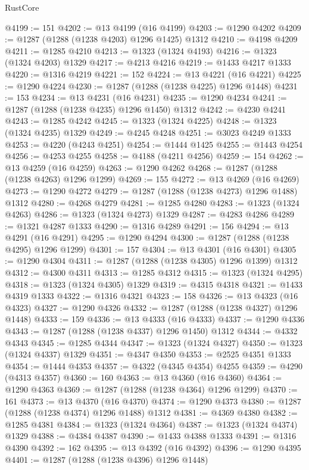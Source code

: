 \begin{lexlean}{RustCore}
\begin{coremodule}
@4199 := 151
@4202 := @13 @4199 (@16 @4199)
@4203 := @1290 @4202
@4209 := @1287 (@1288 (@1238 @4203) @1296 @1425) @1312
@4210 := @4198 @4209
@4211 := @1285 @4210
@4213 := @1323 (@1324 @4193)
@4216 := @1323 (@1324 @4203) @1329
@4217 := @4213 @4216
@4219 := @1433 @4217 @1333
@4220 := @1316 @4219
@4221 := 152
@4224 := @13 @4221 (@16 @4221)
@4225 := @1290 @4224
@4230 := @1287 (@1288 (@1238 @4225) @1296 @1448)
@4231 := 153
@4234 := @13 @4231 (@16 @4231)
@4235 := @1290 @4234
@4241 := @1287 (@1288 (@1238 @4235) @1296 @1450) @1312
@4242 := @4230 @4241
@4243 := @1285 @4242
@4245 := @1323 (@1324 @4225)
@4248 := @1323 (@1324 @4235) @1329
@4249 := @4245 @4248
@4251 := @3023 @4249 @1333
@4253 := @4220 (@4243 @4251)
@4254 := @1444 @1425
@4255 := @1443 @4254
@4256 := @4253 @4255
@4258 := @4188 (@4211 @4256)
@4259 := 154
@4262 := @13 @4259 (@16 @4259)
@4263 := @1290 @4262
@4268 := @1287 (@1288 (@1238 @4263) @1296 @1299)
@4269 := 155
@4272 := @13 @4269 (@16 @4269)
@4273 := @1290 @4272
@4279 := @1287 (@1288 (@1238 @4273) @1296 @1488) @1312
@4280 := @4268 @4279
@4281 := @1285 @4280
@4283 := @1323 (@1324 @4263)
@4286 := @1323 (@1324 @4273) @1329
@4287 := @4283 @4286
@4289 := @1321 @4287 @1333
@4290 := @1316 @4289
@4291 := 156
@4294 := @13 @4291 (@16 @4291)
@4295 := @1290 @4294
@4300 := @1287 (@1288 (@1238 @4295) @1296 @1299)
@4301 := 157
@4304 := @13 @4301 (@16 @4301)
@4305 := @1290 @4304
@4311 := @1287 (@1288 (@1238 @4305) @1296 @1399) @1312
@4312 := @4300 @4311
@4313 := @1285 @4312
@4315 := @1323 (@1324 @4295)
@4318 := @1323 (@1324 @4305) @1329
@4319 := @4315 @4318
@4321 := @1433 @4319 @1333
@4322 := @1316 @4321
@4323 := 158
@4326 := @13 @4323 (@16 @4323)
@4327 := @1290 @4326
@4332 := @1287 (@1288 (@1238 @4327) @1296 @1448)
@4333 := 159
@4336 := @13 @4333 (@16 @4333)
@4337 := @1290 @4336
@4343 := @1287 (@1288 (@1238 @4337) @1296 @1450) @1312
@4344 := @4332 @4343
@4345 := @1285 @4344
@4347 := @1323 (@1324 @4327)
@4350 := @1323 (@1324 @4337) @1329
@4351 := @4347 @4350
@4353 := @2525 @4351 @1333
@4354 := @1444 @4353
@4357 := @4322 (@4345 @4354) @4255
@4359 := @4290 (@4313 @4357)
@4360 := 160
@4363 := @13 @4360 (@16 @4360)
@4364 := @1290 @4363
@4369 := @1287 (@1288 (@1238 @4364) @1296 @1299)
@4370 := 161
@4373 := @13 @4370 (@16 @4370)
@4374 := @1290 @4373
@4380 := @1287 (@1288 (@1238 @4374) @1296 @1488) @1312
@4381 := @4369 @4380
@4382 := @1285 @4381
@4384 := @1323 (@1324 @4364)
@4387 := @1323 (@1324 @4374) @1329
@4388 := @4384 @4387
@4390 := @1433 @4388 @1333
@4391 := @1316 @4390
@4392 := 162
@4395 := @13 @4392 (@16 @4392)
@4396 := @1290 @4395
@4401 := @1287 (@1288 (@1238 @4396) @1296 @1448)

\end{coremodule}
\end{lexlean}
